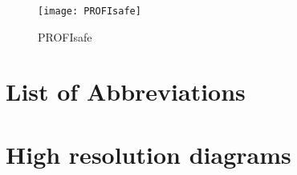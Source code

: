 \documentclass[11pt]{report}
\begin{document}
\begin{center}
\begin{figure}[htbp]
\texttt{[image: PROFIsafe]}
\caption{PROFIsafe}
\label{Abb.:1}
\end{figure}
\end{center}


\begin{appendix}
\chapter{List of Abbreviations}
\chapter{High resolution diagrams}
\end{appendix}


\nocite{mseifter88,pmandl97,weiss92,weiss92a,ginthoer93}

\newpage
\addtocounter{page}{1}
\addtocounter{page}{-1}





%
\end{document}
